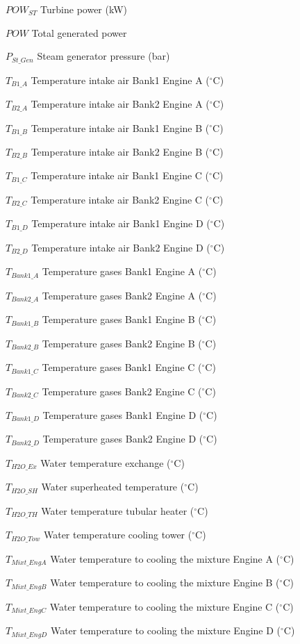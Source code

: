 \documentclass[preprint,12pt]{elsarticle}
\begin{document}
\par $POW_{ST}$	Turbine power (kW)
\par $POW$		Total generated power
\par $P_{St\_Gen}$	Steam generator pressure (bar)
\par $T_{B1\_A}$	Temperature intake air Bank1 Engine A ($^{\circ}$C) 
\par $T_{B2\_A}$	Temperature intake air Bank2 Engine A ($^{\circ}$C) 
\par $T_{B1\_B}$	Temperature intake air Bank1 Engine B ($^{\circ}$C) 
\par $T_{B2\_B}$	Temperature intake air Bank2 Engine B ($^{\circ}$C) 
\par $T_{B1\_C}$	Temperature intake air Bank1 Engine C ($^{\circ}$C) 
\par $T_{B2\_C}$	Temperature intake air Bank2 Engine C ($^{\circ}$C) 
\par $T_{B1\_D}$	Temperature intake air Bank1 Engine D ($^{\circ}$C) 
\par $T_{B2\_D}$	Temperature intake air Bank2 Engine D ($^{\circ}$C) 
\par $T_{Bank1\_A}$	Temperature gases Bank1 Engine A ($^{\circ}$C) 
\par $T_{Bank2\_A}$	Temperature gases Bank2 Engine A ($^{\circ}$C) 
\par $T_{Bank1\_B}$	Temperature gases Bank1 Engine B ($^{\circ}$C) 
\par $T_{Bank2\_B}$	Temperature gases Bank2 Engine B ($^{\circ}$C) 
\par $T_{Bank1\_C}$	Temperature gases Bank1 Engine C ($^{\circ}$C) 
\par $T_{Bank2\_C}$	Temperature gases Bank2 Engine C ($^{\circ}$C) 
\par $T_{Bank1\_D}$	Temperature gases Bank1 Engine D ($^{\circ}$C) 
\par $T_{Bank2\_D}$	Temperature gases Bank2 Engine D ($^{\circ}$C) 
\par $T_{H2O\_Ex}$	Water temperature exchange ($^{\circ}$C) 
\par $T_{H2O\_SH}$	Water superheated temperature ($^{\circ}$C) 
\par $T_{H2O\_TH}$	Water temperature tubular heater ($^{\circ}$C) 
\par $T_{H2O\_Tow}$	Water temperature cooling tower ($^{\circ}$C) 
\par $T_{Mixt\_EngA}$	Water temperature to cooling the mixture Engine A ($^{\circ}$C) 
\par $T_{Mixt\_EngB}$	Water temperature to cooling the mixture Engine B ($^{\circ}$C)  
\par $T_{Mixt\_EngC}$	Water temperature to cooling the mixture Engine C ($^{\circ}$C)  
\par $T_{Mixt\_EngD}$	Water temperature to cooling the mixture Engine D ($^{\circ}$C)

\FloatBarrier
 



\end{document}
